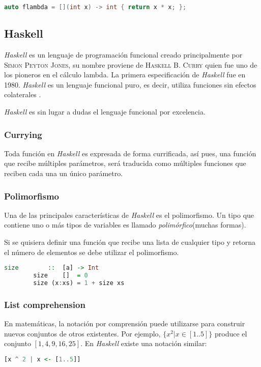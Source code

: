 		\begin{lstlisting}[language=C++, caption=Auto type en C++]
		auto flambda = [](int x) -> int { return x * x; };
		\end{lstlisting}
				
	\subsection{Haskell}
		\emph{Haskell} es un lenguaje de programación funcional creado principalmente por \textsc{Simon Peyton Jones}, su nombre proviene de \textsc{Haskell B. Curry} quien fue uno de los pioneros en el cálculo lambda. La primera especificación de \emph{Haskell} fue en 1980. \emph{Haskell} es un lenguaje funcional puro, es decir, utiliza funciones sin efectos colaterales \cite{Thompson2011}.
		
		\emph{Haskell} es sin lugar a dudas el lenguaje funcional por excelencia.
		
		\subsubsection{Currying}
		Toda función en \emph{Haskell} es expresada de forma currificada, así pues, una función que recibe múltiples parámetros, será traducida como múltiples funciones que reciben cada una un único parámetro.
		
		\subsubsection{Polimorfismo}
		Una de las principales características de \emph{Haskell} es el polimorfismo. Un tipo que contiene uno o más tipos de variables es llamado \emph{polimórfico}(muchas formas).\cite{Hutton2007}
		
		Si se quisiera definir una función que recibe una lista de cualquier tipo y retorna el número de elementos se debe utilizar el polimorfismo.
		
		\begin{lstlisting}[language=Haskell, caption=Polimorfismo]
		size		::	[a] -> Int
		size 	[]	= 0
		size (x:xs) = 1 + size xs
		\end{lstlisting}
		
		\subsubsection{List comprehension}
		En matemáticas, la notación por comprensión puede utilizarse para construir nuevos conjuntos de otros existentes. Por ejemplo, $\{x^2 | x \in [1..5]\}$ produce el conjunto $[1,4,9,16,25]$. En \emph{Haskell} existe una notación similar: \cite{Hutton2007}
		\begin{lstlisting}[language=Haskell, caption=List comprehension]
		[x ^ 2 | x <- [1..5]]
		\end{lstlisting}



